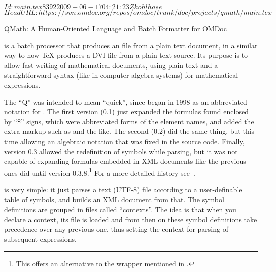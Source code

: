 \svnInfo $Id: main.tex 8392 2009-06-17 04:21:23Z kohlhase $
\svnKeyword $HeadURL: https://svn.omdoc.org/repos/omdoc/trunk/doc/projects/qmath/main.tex $

\begin{omgroup}[id=qmath,short=QMath Parser,creators=alberto]
  {QMath: A Human-Oriented Language and Batch Formatter for OMDoc}


{\qmath} is a batch processor that produces an {\omdoc} file from a plain {\unicode}
text document, in a similar way to how {\TeX} produces a DVI file from a plain
text source. Its purpose is to allow fast writing of mathematical
documents, using plain text and a straightforward syntax (like in computer algebra
systems) for mathematical expressions.

The ``Q'' was intended to mean ``quick'', since {\qmath} began in 1998 as an abbreviated
notation for {\mathml}. The first version (0.1) just expanded the formulas found enclosed
by ``{\$}'' signs, which were abbreviated forms of the {\mathml} element names, and added
the extra markup such as {} and the like. The second (0.2) did the same
thing, but this time allowing an algebraic notation that was fixed in the source code.
Finally, version 0.3 allowed the redefinition of symbols while parsing, but it was not
capable of expanding formulas embedded in XML documents like the previous ones did until
version 0.3.8.\footnote{\footnotesize{This offers an alternative to the {}
    wrapper mentioned in {}.}}  For a more detailed history
see~\cite{QMathHistory:URL}.

{\qmath} is very simple: it just parses a text (UTF-8) file according to a user-definable
table of symbols, and builds an XML document from that. The symbol definitions are grouped
in files called ``contexts''. The idea is that when you declare a context, its file is
loaded and from then on these symbol definitions take precedence over any previous one,
thus setting the context for parsing of subsequent expressions.


\end{omgroup}
